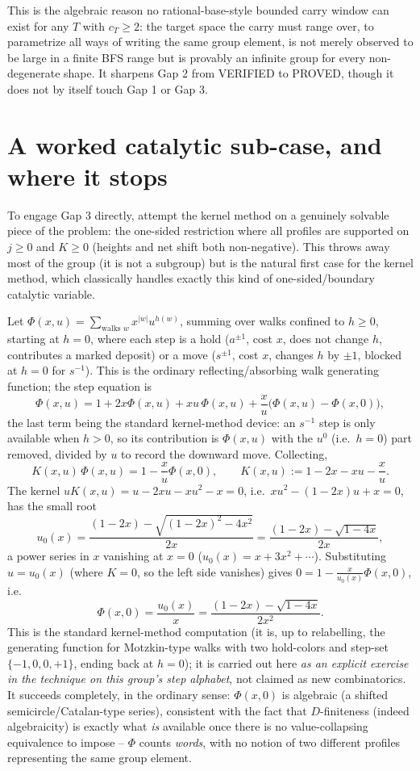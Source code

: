 \documentclass[11pt]{article}
\theoremstyle{remark}
\begin{document}
\noindent This is the algebraic reason no rational-base-style bounded carry window can exist for any
$T$ with $c_T\ge2$: the target space the carry must range over, to parametrize all ways of writing the
same group element, is not merely observed to be large in a finite BFS range but is provably an infinite
group for every non-degenerate shape. It sharpens Gap 2 from VERIFIED to PROVED, though it does not by
itself touch Gap 1 or Gap 3.

\section{A worked catalytic sub-case, and where it stops}\label{sec:kernel}

To engage Gap 3 directly, attempt the kernel method on a genuinely solvable piece of the problem: the
one-sided restriction where all profiles are supported on $j\ge0$ and $K\ge0$ (heights and net shift
both non-negative). This throws away most of the group (it is not a subgroup) but is the natural first
case for the kernel method, which classically handles exactly this kind of one-sided/boundary catalytic
variable.

Let $\Phi(x,u)=\sum_{\text{walks }w} x^{|w|}u^{h(w)}$, summing over walks confined to $h\ge0$, starting
at $h=0$, where each step is a hold ($a^{\pm1}$, cost $x$, does not change $h$, contributes a marked
deposit) or a move ($s^{\pm1}$, cost $x$, changes $h$ by $\pm1$, blocked at $h=0$ for $s^{-1}$). This is
the ordinary reflecting/absorbing walk generating function; the step equation is
\[
\Phi(x,u) = 1 + 2x\Phi(x,u) + xu\,\Phi(x,u) + \frac{x}{u}\bigl(\Phi(x,u)-\Phi(x,0)\bigr),
\]
the last term being the standard kernel-method device: an $s^{-1}$ step is only available when $h>0$, so
its contribution is $\Phi(x,u)$ with the $u^0$ (i.e.\ $h=0$) part removed, divided by $u$ to record the
downward move. Collecting,
\[
K(x,u)\,\Phi(x,u) = 1 - \frac{x}{u}\Phi(x,0), \qquad K(x,u):=1-2x-xu-\frac{x}{u}.
\]
The kernel $uK(x,u)=u-2xu-xu^2-x=0$, i.e.\ $xu^2-(1-2x)u+x=0$, has the small root
\[
u_0(x)=\frac{(1-2x)-\sqrt{(1-2x)^2-4x^2}}{2x} = \frac{(1-2x)-\sqrt{1-4x}}{2x},
\]
a power series in $x$ vanishing at $x=0$ ($u_0(x)=x+3x^2+\cdots$). Substituting $u=u_0(x)$ (where
$K=0$, so the left side vanishes) gives $0=1-\frac{x}{u_0(x)}\Phi(x,0)$, i.e.
\[
\Phi(x,0) = \frac{u_0(x)}{x} = \frac{(1-2x)-\sqrt{1-4x}}{2x^2}.
\]
This is the standard kernel-method computation (it is, up to relabelling, the generating function for
Motzkin-type walks with two hold-colors and step-set $\{-1,0,0,+1\}$, ending back at $h=0$); it is
carried out here \emph{as an explicit exercise in the technique on this group's step alphabet}, not
claimed as new combinatorics. It succeeds completely, in the ordinary sense: $\Phi(x,0)$ is algebraic
(a shifted semicircle/Catalan-type series), consistent with the fact that $D$-finiteness (indeed
algebraicity) is exactly what \emph{is} available once there is no value-collapsing equivalence to
impose -- $\Phi$ counts \emph{words}, with no notion of two different profiles representing the same
group element.
\end{document}
